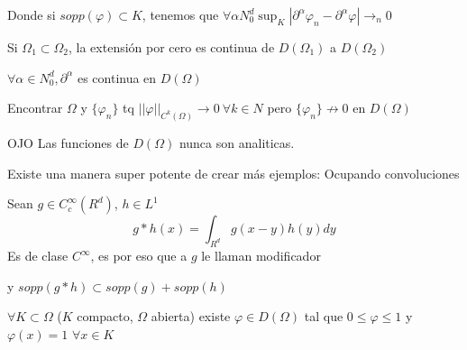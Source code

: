 Donde si $sopp(\varphi) \subset K$, tenemos que $\forall \alpha N_0^{d} \sup_K |\partial^{\alpha} \varphi_n - \partial^{\alpha} \varphi| \to_n 0$

\begin{exercise}
Si $\Omega_1 \subset \Omega_2$, la extensión por cero es continua de $D(\Omega_1)$ a $D(\Omega_2)$

$\forall \alpha \in N_0^{d}, \partial^{\alpha}$ es continua en $D(\Omega)$

Encontrar $\Omega$ y $\{ \varphi_n\}$ tq $||\varphi||_{C^{k}(\Omega)} \to 0 \ \forall k \in N$ pero $\{ \varphi_n \} \not \to 0$ en $D(\Omega)$
\end{exercise}











OJO Las funciones de $D(\Omega)$ nunca son analiticas.

\begin{example}
\end{example}

Existe una manera super potente de crear más ejemplos: Ocupando convoluciones

\begin{definition}
Sean $g \in C_{c}^{\infty}(R^d)$, $h \in L^1$
\begin{equation}
    g * h(x) = \int_{R^d} g(x-y)  h(y) dy
\end{equation}
Es de clase $C^\infty$, es por eso que a $g$ le llaman modificador

y $sopp(g*h) \subset sopp(g) + sopp(h)$
\end{definition}

\begin{exercise}
$\forall K \subset \Omega$ ($K$ compacto, $\Omega$ abierta) existe $\varphi \in D(\Omega)$ tal que $0\leq \varphi \leq 1$ y $\varphi(x) = 1$ $\forall x \in K$
\end{exercise}



